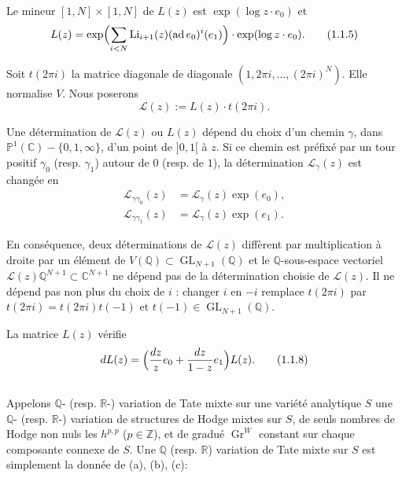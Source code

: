 \documentclass[12pt,a4paper]{article}
\theoremstyle{plain}
\theoremstyle{definition}
\theoremstyle{remark}
\DeclareMathOperator{\ad}{ad}
\newcommand{\Q}{\mathbb{Q}}
\newcommand{\R}{\mathbb{R}}
\newcommand{\C}{\mathbb{C}}
\newcommand{\Z}{\mathbb{Z}}
\newcommand{\IP}{\mathbb{P}}
\begin{document}
Le mineur $[1,N]\times[1,N]$ de $L(z)$ est $\exp(\log z\cdot e_0)$ et
\begin{equation}\label{eq:1.1.5}
L(z) = \exp\Bigl(\sum_{i<N} \operatorname{Li}_{i+1}(z)(\ad e_0)^i(e_1)\Bigr)\cdot\exp(\log z\cdot e_0).
\tag{1.1.5}
\end{equation}

Soit $t(2\pi i)$ la matrice diagonale de diagonale $(1,2\pi i,\ldots,(2\pi i)^N)$. Elle normalise $V$. Nous poserons
\begin{equation*}
\mathcal{L}(z) := L(z)\cdot t(2\pi i).
\end{equation*}

Une d{\'e}termination de $\mathcal{L}(z)$ ou $L(z)$ d{\'e}pend du choix d'un chemin $\gamma$, dans $\IP^1(\C)-\{0,1,\infty\}$, d'un point de $]0,1[$ {\`a} $z$. Si ce chemin est pr{\'e}fix{\'e} par un tour positif $\gamma_0$ (resp. $\gamma_1$) autour de $0$ (resp. de $1$), la d{\'e}termination $\mathcal{L}_\gamma(z)$ est chang{\'e}e en
\begin{align}
\mathcal{L}_{\gamma\gamma_0}(z) &= \mathcal{L}_\gamma(z)\exp(e_0), \tag{1.1.6}\label{eq:1.1.6}\\
\mathcal{L}_{\gamma\gamma_1}(z) &= \mathcal{L}_\gamma(z)\exp(e_1). \tag{1.1.7}\label{eq:1.1.7}
\end{align}

En cons{\'e}quence, deux d{\'e}terminations de $\mathcal{L}(z)$ diff{\`e}rent par multiplication {\`a} droite par un {\'e}l{\'e}ment de $V(\Q)\subset\operatorname{GL}_{N+1}(\Q)$ et le $\Q$-sous-espace vectoriel $\mathcal{L}(z)\Q^{N+1}\subset\C^{N+1}$ ne d{\'e}pend pas de la d{\'e}termination choisie de $\mathcal{L}(z)$. Il ne d{\'e}pend pas non plus du choix de $i$ : changer $i$ en $-i$ remplace $t(2\pi i)$ par $t(2\pi i)=t(2\pi i)t(-1)$ et $t(-1)\in\operatorname{GL}_{N+1}(\Q)$.

La matrice $L(z)$ v{\'e}rifie
\begin{equation}\label{eq:1.1.8}
dL(z) = \Bigl(\frac{dz}{z}e_0 + \frac{dz}{1-z}e_1\Bigr)L(z).
\tag{1.1.8}
\end{equation}

\subsection{}

Appelons $\Q$- (resp. $\R$-) variation de Tate mixte sur une vari{\'e}t{\'e} analytique $S$ une $\Q$- (resp. $\R$-) variation de structures de Hodge mixtes sur $S$, de seuls nombres de Hodge non nuls les $h^{p,p}$ ($p\in\Z$), et de gradu{\'e} $\operatorname{Gr}^W$ constant sur chaque composante connexe de $S$. Une $\Q$ (resp. $\R$) variation de Tate mixte sur $S$ est simplement la donn{\'e}e de (a), (b), (c):
\end{document}

